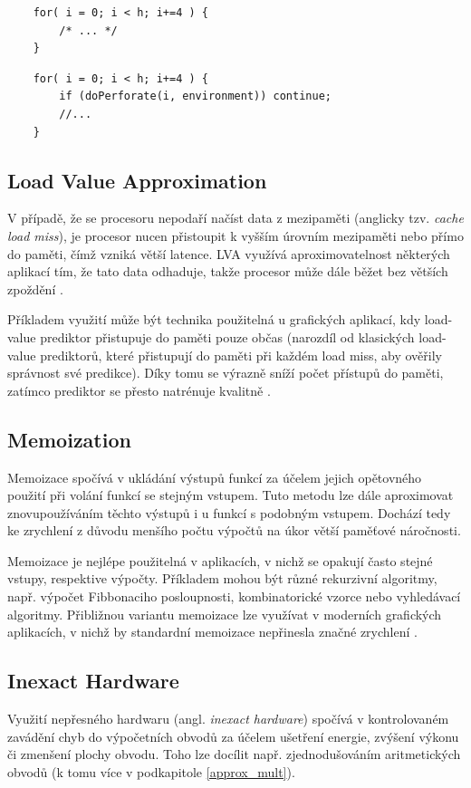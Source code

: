 \begin{verbatim}
    for( i = 0; i < h; i+=4 ) { 
        /* ... */ 
    }
\end{verbatim}

\begin{verbatim}
    for( i = 0; i < h; i+=4 ) {
        if (doPerforate(i, environment)) continue;
        //...
    }
\end{verbatim}

\subsection*{Load Value Approximation}
V případě, že se procesoru nepodaří načíst data z mezipaměti (anglicky tzv. \textit{cache load miss}), je procesor nucen přistoupit k vyšším úrovním mezipaměti nebo přímo do paměti, čímž vzniká větší latence. LVA využívá aproximovatelnost některých aplikací tím, že tato data odhaduje, takže procesor může dále běžet bez větších zpoždění \cite{ac_techniques}.

Příkladem využití může být technika použitelná u grafických aplikací, kdy load-value prediktor přistupuje do paměti pouze občas (narozdíl od klasických load-value prediktorů, které přistupují do paměti při každém load miss, aby ověřily správnost své predikce). Díky tomu se výrazně sníží počet přístupů do paměti, zatímco prediktor se přesto natrénuje kvalitně \cite{load_value_approx}.

\subsection*{Memoization}
Memoizace spočívá v ukládání výstupů funkcí za účelem jejich opětovného použití při volání funkcí se stejným vstupem. Tuto metodu lze dále aproximovat znovupoužíváním těchto výstupů i u funkcí s podobným vstupem. Dochází tedy ke zrychlení z důvodu menšího počtu výpočtů na úkor větší paměťové náročnosti.

Memoizace je nejlépe použitelná v aplikacích, v nichž se opakují často stejné vstupy, respektive výpočty. Příkladem mohou být různé rekurzivní algoritmy, např. výpočet Fibbonaciho posloupnosti, kombinatorické vzorce nebo vyhledávací algoritmy. Přibližnou variantu memoizace lze využívat v moderních grafických aplikacích, v nichž by standardní memoizace nepřinesla značné zrychlení \cite{ac_techniques}.

\subsection*{Inexact Hardware}
Využití nepřesného hardwaru (angl. \textit{inexact hardware}) spočívá v kontrolovaném zavádění chyb do výpočetních obvodů za účelem ušetření energie, zvýšení výkonu či zmenšení plochy obvodu. Toho lze docílit např. zjednodušováním aritmetických obvodů (k tomu více v podkapitole \ref{approx_mult}).

